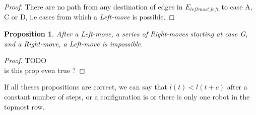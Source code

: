 \documentclass[11pt, a4paper]{article}
\theoremstyle{plain}
\newtheorem{prop}[thm]{Proposition}
\theoremstyle{definition}
\theoremstyle{remark}
\begin{document}
\begin{proof}
There are no path from any destination of edges in $E_{leftmost\_left}$ to case
A, C or D, i.e cases from which a \emph{Left-move} is possible.
\end{proof}


\begin{prop}
After a \emph{Left-move}, a series of \emph{Right-move}s starting at case G,
and a \emph{Right-move}, a \emph{Left-move} is impossible.
\end{prop}

\begin{proof}
TODO\\
is this prop even true ?
\end{proof}

If all theses propositions are correct, we can say that $l(t) < l(t+c)$ after a
constant number of steps, or a configuration is \Gathered or there is only one
robot in the topmost row.

\appendix
\end{document}
